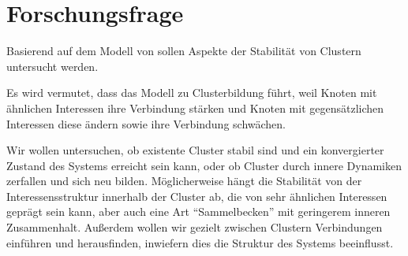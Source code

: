 \documentclass[11pt, a4paper]{scrartcl}
\begin{document}
\section{Forschungsfrage}

Basierend auf dem Modell von \autocite{Koehler-Bussmeier2018} sollen Aspekte der Stabilität von Clustern untersucht werden.

Es wird vermutet, dass das Modell zu Clusterbildung führt, weil Knoten mit ähnlichen Interessen ihre Verbindung stärken und Knoten mit gegensätzlichen Interessen diese ändern sowie ihre Verbindung schwächen.

Wir wollen untersuchen, ob existente Cluster stabil sind und ein konvergierter Zustand des Systems erreicht sein kann, oder ob Cluster durch innere Dynamiken zerfallen und sich neu bilden. Möglicherweise hängt die Stabilität von der Interessensstruktur innerhalb der Cluster ab, die von sehr ähnlichen Interessen geprägt sein kann, aber auch eine Art "`Sammelbecken"' mit geringerem inneren Zusammenhalt. Außerdem wollen wir gezielt zwischen Clustern Verbindungen einführen und herausfinden, inwiefern dies die Struktur des Systems beeinflusst.
\end{document}
